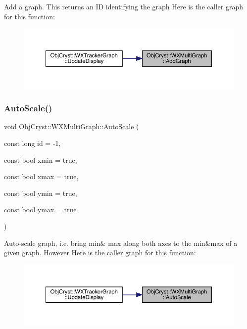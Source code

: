 Add a graph. This returns an ID identifying the graph Here is the caller graph for this function\+:
\nopagebreak
\begin{figure}[H]
\begin{center}
\leavevmode
\includegraphics[width=350pt]{class_obj_cryst_1_1_w_x_multi_graph_adf6e7de19af871df66a70214dad61905_icgraph}
\end{center}
\end{figure}
\mbox{\label{class_obj_cryst_1_1_w_x_multi_graph_ae74176e7ad5b5c348328147456569092}} 
\subsubsection{\texorpdfstring{AutoScale()}{AutoScale()}}
{\footnotesize\ttfamily void Obj\+Cryst\+::\+W\+X\+Multi\+Graph\+::\+Auto\+Scale (\begin{DoxyParamCaption}\item[{const long}]{id = {\ttfamily -\/1},  }\item[{const bool}]{xmin = {\ttfamily true},  }\item[{const bool}]{xmax = {\ttfamily true},  }\item[{const bool}]{ymin = {\ttfamily true},  }\item[{const bool}]{ymax = {\ttfamily true} }\end{DoxyParamCaption})}

Auto-\/scale graph, i.\+e. bring min\& max along both axes to the min\&max of a given graph. However Here is the caller graph for this function\+:
\nopagebreak
\begin{figure}[H]
\begin{center}
\leavevmode
\includegraphics[width=350pt]{class_obj_cryst_1_1_w_x_multi_graph_ae74176e7ad5b5c348328147456569092_icgraph}
\end{center}
\end{figure}
\mbox{\label{class_obj_cryst_1_1_w_x_multi_graph_aeeea3497b22a397a5a521322698c3166}} 
